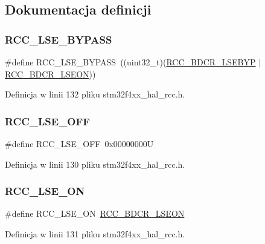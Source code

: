 \subsection{Dokumentacja definicji}
\mbox{\label{group___r_c_c___l_s_e___config_gaad580157edbae878edbcc83c5a68e767}} 
\subsubsection{\texorpdfstring{R\+C\+C\+\_\+\+L\+S\+E\+\_\+\+B\+Y\+P\+A\+SS}{RCC\_LSE\_BYPASS}}
{\footnotesize\ttfamily \#define R\+C\+C\+\_\+\+L\+S\+E\+\_\+\+B\+Y\+P\+A\+SS~((uint32\+\_\+t)(\hyperlink{group___peripheral___registers___bits___definition_ga542dffd7f8dc4da5401b54d822a22af0}{R\+C\+C\+\_\+\+B\+D\+C\+R\+\_\+\+L\+S\+E\+B\+YP} $\vert$ \hyperlink{group___peripheral___registers___bits___definition_ga00145f8814cb9a5b180d76499d97aead}{R\+C\+C\+\_\+\+B\+D\+C\+R\+\_\+\+L\+S\+E\+ON}))}



Definicja w linii 132 pliku stm32f4xx\+\_\+hal\+\_\+rcc.\+h.

\mbox{\label{group___r_c_c___l_s_e___config_ga6645c27708d0cad1a4ab61d2abb24c77}} 
\subsubsection{\texorpdfstring{R\+C\+C\+\_\+\+L\+S\+E\+\_\+\+O\+FF}{RCC\_LSE\_OFF}}
{\footnotesize\ttfamily \#define R\+C\+C\+\_\+\+L\+S\+E\+\_\+\+O\+FF~0x00000000U}



Definicja w linii 130 pliku stm32f4xx\+\_\+hal\+\_\+rcc.\+h.

\mbox{\label{group___r_c_c___l_s_e___config_gac981ea636c2f215e4473901e0912f55a}} 
\subsubsection{\texorpdfstring{R\+C\+C\+\_\+\+L\+S\+E\+\_\+\+ON}{RCC\_LSE\_ON}}
{\footnotesize\ttfamily \#define R\+C\+C\+\_\+\+L\+S\+E\+\_\+\+ON~\hyperlink{group___peripheral___registers___bits___definition_ga00145f8814cb9a5b180d76499d97aead}{R\+C\+C\+\_\+\+B\+D\+C\+R\+\_\+\+L\+S\+E\+ON}}



Definicja w linii 131 pliku stm32f4xx\+\_\+hal\+\_\+rcc.\+h.


